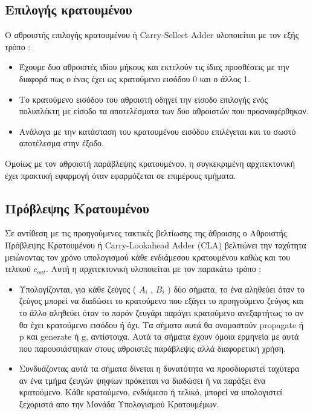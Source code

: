 \subsection{Επιλογής κρατουμένου}
Ο αθροιστής επιλογής κρατουμένου ή Carry-Sellect Adder υλοποιείται με τον εξής τρόπο :
\begin{itemize}
  \item Έχουμε δυο αθροιστές ιδίου μήκους και εκτελούν τις ίδιες προσθέσεις με την διαφορά πως ο ένας έχει ως κρατούμενο εισόδου 0 και ο άλλος 1.
  \item Το κρατούμενο εισόδου του αθροιστή οδηγεί την είσοδο επιλογής ενός πολυπλέκτη με είσοδο τα αποτελέσματα των δυο αθροιστών που προαναφέρθηκαν.
  \item Ανάλογα με την κατάσταση του κρατουμένου εισόδου επιλέγεται και το σωστό αποτέλεσμα στην έξοδο.
\end{itemize} 
Ομοίως με τον αθροιστή παράβλεψης κρατουμένου, η συγκεκριμένη αρχιτεκτονική έχει πρακτική εφαρμογή όταν εφαρμόζεται σε επιμέρους τμήματα.








\subsection{Πρόβλεψης Κρατουμένου}
Σε αντίθεση με τις προηγούμενες τακτικές βελτίωσης της άθροισης ο Αθροιστής Πρόβλεψης Κρατουμένου ή Carry-Lookahead Adder (CLA) βελτιώνει την ταχύτητα μειώνοντας τον χρόνο υπολογισμού κάθε ενδιάμεσου κρατουμένου καθώς και του τελικού $c_{out}$.
Αυτή η αρχιτεκτονική υλοποιείται με τον παρακάτω τρόπο :
\begin{itemize}
    \item Υπολογίζονται, για κάθε ζεύγος ( $A_i$ , $B_i$ ) δύο σήματα, το ένα αληθεύει 
    όταν το ζεύγος μπορεί να διαδώσει το κρατούμενο που εξάγει το προηγούμενο ζεύγος 
    και το άλλο αληθεύει όταν το παρόν ζευγάρι παράγει κρατούμενο ανεξαρτήτως το 
    αν θα έχει κρατούμενο εισόδου ή όχι. Τα σήματα αυτά θα ονομαστούν propagate ή p
    και generate ή g, αντίστοιχα. Αυτά τα σήματα έχουν όμοια ερμηνεία με αυτά που παρουσιάστηκαν στους αθροιστές παράβλεψις αλλά διαφορετική χρήση.
    \item Συνδυάζοντας αυτά τα σήματα δίνεται η δυνατότητα να προσδιοριστεί ταχύτερα αν ένα τμήμα ζευγών ψηφίων πρόκειται να διαδώσει ή να παράξει ένα κρατούμενο. Κάθε κρατούμενο, ενδιάμεσο ή τελικό, μπορεί να υπολογιστεί ξεχοριστά απο την Μονάδα Υπολογισμού Κρατουμέμων.
\end{itemize}


